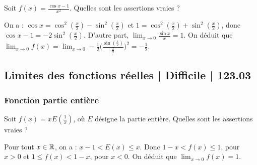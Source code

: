 \begin{question} 
Soit $f(x)= \frac{\cos x-1}{x^2}$. Quelles sont les assertions vraies ?
\begin{answers}

    
    
    
    

 
\end{answers}
\begin{explanations}
On a : $\cos x = \cos^2 (\frac{x}{2}) -  \sin^2 (\frac{x}{2})$ et $1= \cos^2 (\frac{x}{2}) + \sin^2 (\frac{x}{2})$, donc $\cos x - 1 = -2 \sin ^2 (\frac{x}{2})$. D'autre part, $\lim_{x\to 0}\frac{\sin x}{x} = 1$. On déduit que   $\lim_{x\to 0} f(x) = \lim_{x\to 0} -\frac{1}{2}  \big(\frac{\sin (\frac{x}{2})}{\frac{x}{2}}\big)^2 = -\frac{1}{2}$.
\end{explanations}

\end{question}



\subsection{Limites des fonctions réelles | Difficile | 123.03}

\subsubsection{Fonction partie entière}

\begin{question} 
Soit $f(x)= xE(\frac{1}{x})$, où $E$ désigne la partie entière. Quelles sont les assertions vraies ?
\begin{answers}

    
    
    
    

\end{answers}
\begin{explanations}
Pour tout $x\in \mathbb{R}$, on a : $x-1<E(x)\le x$. Donc $1-x < f(x) \le 1$, pour $x>0$ et  
$1 \le f(x) < 1-x$, pour $x<0$. On déduit que $\lim_{x\to 0} f(x) =1$. 
\end{explanations}

\end{question}
 
